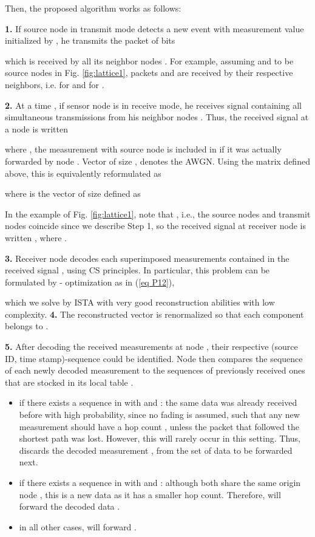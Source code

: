 \documentclass[letterpaper,conference]{IEEEtran}
\begin{document}
Then, the proposed algorithm works as follows:

\noindent \textbf{1.} If source node  in transmit mode detects a new event with measurement value  initialized by , he transmits the packet of  bits

which is received by all its neighbor nodes   .
For example, assuming  and  to be source nodes in Fig. \ref{fig:lattice1}, packets  and  are received by their respective neighbors, i.e.  for  and  for .

\noindent \textbf{2.} At a time , if sensor node  is in receive mode, he receives signal  containing all simultaneous transmissions from his neighbor nodes   . Thus, the received signal at a node  is written
  
where , the measurement with source node  is included in  if it was actually forwarded by node . Vector  of size , denotes the AWGN.
Using the matrix  defined above, this is equivalently reformulated as

where  is the vector of size  defined as

In the example of Fig. \ref{fig:lattice1}, note that , i.e., the source nodes and transmit nodes coincide since we describe Step 1, so the received signal at receiver node  is written , where
.




\noindent \textbf{3.} Receiver node  decodes each superimposed measurements contained in the received signal , using CS principles. In particular, this problem can be formulated by - optimization as in (\ref{eq P12}),
     
which we solve by ISTA with very good reconstruction abilities with low complexity. 
\noindent \textbf{4.} The reconstructed vector  is renormalized so that each component belongs to .

\noindent \textbf{5.} After decoding the received measurements at node , their respective (source ID, time stamp)-sequence  could be identified.
Node  then compares the sequence  of each newly decoded measurement to the sequences of previously received ones that are stocked in its local table .
      \begin{itemize}
        \item if there exists a sequence  in  with  and : the same data was already received before with high probability, since no fading is assumed, such that any new measurement should have a hop count , unless the packet that followed the shortest path was lost. However, this will rarely occur in this setting. Thus,  discards the decoded measurement , from the set of data to be forwarded next.
        \item if there exists a sequence  in  with  and : although both share the same origin node , this is a new data as it has a smaller hop count. Therefore,  will forward the decoded data .
        \item in all other cases,  will forward .
      \end{itemize}
\end{document}
